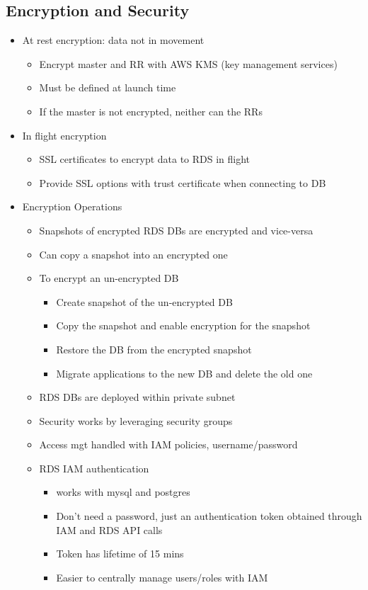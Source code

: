 \documentclass[]{scrartcl}
\begin{document}
\subsection{Encryption and Security}
\begin{itemize}
	\item At rest encryption: data not in movement
	\begin{itemize}
		\item Encrypt master and RR with AWS KMS (key management services)
		\item Must be defined at launch time
		\item If the master is not encrypted, neither can the RRs
	\end{itemize}
	\item In flight encryption
	\begin{itemize}
		\item SSL certificates to encrypt data to RDS in flight
		\item Provide SSL options with trust certificate when connecting to DB
	\end{itemize}
	\item Encryption Operations
	\begin{itemize}
		\item Snapshots of encrypted RDS DBs are encrypted and vice-versa
		\item Can copy a snapshot into an encrypted one
		\item To encrypt an un-encrypted DB
		\begin{itemize}
			\item Create snapshot of the un-encrypted DB
			\item Copy the snapshot and enable encryption for the snapshot
			\item Restore the DB from the encrypted snapshot
			\item Migrate applications to the new DB and delete the old one
		\end{itemize}
		\item RDS DBs are deployed within private subnet
		\item Security works by leveraging security groups
		\item Access mgt handled with IAM policies, username/password
		\item RDS IAM authentication
		\begin{itemize}
			\item works with mysql and postgres
			\item Don't need a password, just an authentication token obtained through IAM and RDS API calls
			\item Token has lifetime of 15 mins
			\item Easier to centrally manage users/roles with IAM
		\end{itemize}
	\end{itemize}
\end{itemize}
\end{document}
